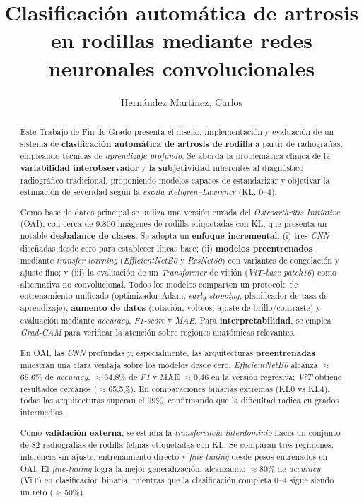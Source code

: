 \documentclass[11pt,spanish,listoffigures,listoftables]{tfgetsinf}
\title{Clasificación automática de artrosis en rodillas mediante redes neuronales convolucionales}
\author{Hernández Martínez, Carlos}
\begin{document}

\begin{abstract}

Este Trabajo de Fin de Grado presenta el diseño, implementación y evaluación de un sistema de \textbf{clasificación automática de artrosis de rodilla} a partir de radiografías, empleando técnicas de \textit{aprendizaje profundo}. Se aborda la problemática clínica de la \textbf{variabilidad interobservador} y la \textbf{subjetividad} inherentes al diagnóstico radiográfico tradicional, proponiendo modelos capaces de estandarizar y objetivar la estimación de severidad según la \textit{escala Kellgren–Lawrence} (KL, 0--4).

Como base de datos principal se utiliza una versión curada del \textit{Osteoarthritis Initiative} (OAI), con cerca de 9.800 imágenes de rodilla etiquetadas con KL, que presenta un notable \textbf{desbalance de clases}. Se adopta un \textbf{enfoque incremental}: (i) tres \textit{CNN} diseñadas desde cero para establecer líneas base; (ii) \textbf{modelos preentrenados} mediante \textit{transfer learning} (\textit{EfficientNetB0} y \textit{ResNet50}) con variantes de congelación y ajuste fino; y (iii) la evaluación de un \textit{Transformer} de visión (\textit{ViT-base patch16}) como alternativa no convolucional. Todos los modelos comparten un protocolo de entrenamiento unificado (optimizador Adam, \textit{early stopping}, planificador de tasa de aprendizaje), \textbf{aumento de datos} (rotación, volteos, ajuste de brillo/contraste) y evaluación mediante \textit{accuracy}, \textit{F1-score} y \textit{MAE}. Para \textbf{interpretabilidad}, se emplea \textit{Grad-CAM} para verificar la atención sobre regiones anatómicas relevantes.

En OAI, las \textit{CNN} profundas y, especialmente, las arquitecturas \textbf{preentrenadas} muestran una clara ventaja sobre los modelos desde cero. \textit{EfficientNetB0} alcanza $\approx$68,6\% de \textit{accuracy}, $\approx$64,8\% de \textit{F1} y MAE $\approx$0,46 en la versión regresiva; \textit{ViT} obtiene resultados cercanos ($\approx$65,5\%). En comparaciones binarias extremas (KL0 vs KL4), todas las arquitecturas superan el 99\%, confirmando que la dificultad radica en grados intermedios.

Como \textbf{validación externa}, se estudia la \textit{transferencia interdominio} hacia un conjunto de 82 radiografías de rodilla felinas etiquetadas con KL. Se comparan tres regímenes: inferencia sin ajuste, entrenamiento directo y \textit{fine-tuning} desde pesos entrenados en OAI. El \textit{fine-tuning} logra la mejor generalización, alcanzando $\approx$80\% de \textit{accuracy} (ViT) en clasificación binaria, mientras que la clasificación completa 0--4 sigue siendo un reto ($\approx$50\%).


\end{abstract}
\end{document}
